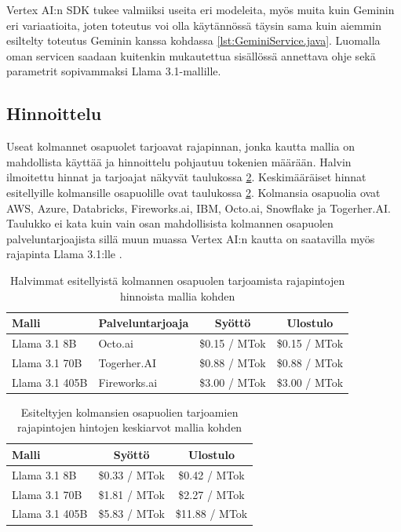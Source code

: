 Vertex AI:n SDK tukee valmiiksi useita eri modeleita, myös muita kuin Geminin
eri variaatioita, joten toteutus voi olla käytännössä täysin sama kuin aiemmin
esiltelty toteutus Geminin kanssa kohdassa \ref{lst:GeminiService.java}.
Luomalla oman servicen saadaan kuitenkin mukautettua sisällössä annettava ohje
sekä parametrit sopivammaksi Llama 3.1-mallille.

\subsection{Hinnoittelu}

Useat kolmannet osapuolet tarjoavat rajapinnan, jonka kautta mallia on
mahdollista käyttää ja hinnoittelu pohjautuu tokenien määrään. Halvin
ilmoitettu hinnat ja tarjoajat näkyvät taulukossa
\ref{tab:third-party-llama-prices}. Keskimääräiset hinnat esitellyille
kolmansille osapuolille ovat taulukossa \ref{tab:third-party-llama-prices}.
Kolmansia osapuolia ovat AWS, Azure, Databricks, Fireworks.ai, IBM, Octo.ai,
Snowflake ja Togerher.AI. \parencite{llama} Taulukko ei kata kuin vain osan
mahdollisista kolmannen osapuolen palveluntarjoajista sillä muun muassa
Vertex AI:n kautta on saatavilla myös rajapinta Llama 3.1:lle
\parencite{vertexAiModelGardenLlama3}.

\begin{table}[H]
  \centering
  \caption{Halvimmat esitellyistä kolmannen osapuolen tarjoamista rajapintojen hinnoista mallia kohden \parencite{llama}}
  \label{tab:third-party-llama-prices}
  \begin{tabular}{llcc}
    \textbf{Malli} & \textbf{Palveluntarjoaja} & \textbf{Syöttö} & \textbf{Ulostulo} \\
    \hline
    Llama 3.1 8B   & Octo.ai      & \$0.15 / MTok & \$0.15 / MTok \\
    Llama 3.1 70B  & Togerher.AI  & \$0.88 / MTok & \$0.88 / MTok \\
    Llama 3.1 405B & Fireworks.ai & \$3.00 / MTok & \$3.00 / MTok \\
    \hline
  \end{tabular}
\end{table}

\begin{table}[H]
  \centering
  \caption{Esiteltyjen kolmansien osapuolien tarjoamien rajapintojen hintojen keskiarvot mallia kohden \parencite{llama}}
  \label{tab:third-party-llama-prices}
  \begin{tabular}{lcc}
    \textbf{Malli} & \textbf{Syöttö} & \textbf{Ulostulo} \\
    \hline
    Llama 3.1 8B   & \$0.33 / MTok &  \$0.42 / MTok \\
    Llama 3.1 70B  & \$1.81 / MTok &  \$2.27 / MTok \\
    Llama 3.1 405B & \$5.83 / MTok & \$11.88 / MTok \\
    \hline
  \end{tabular}
\end{table}

